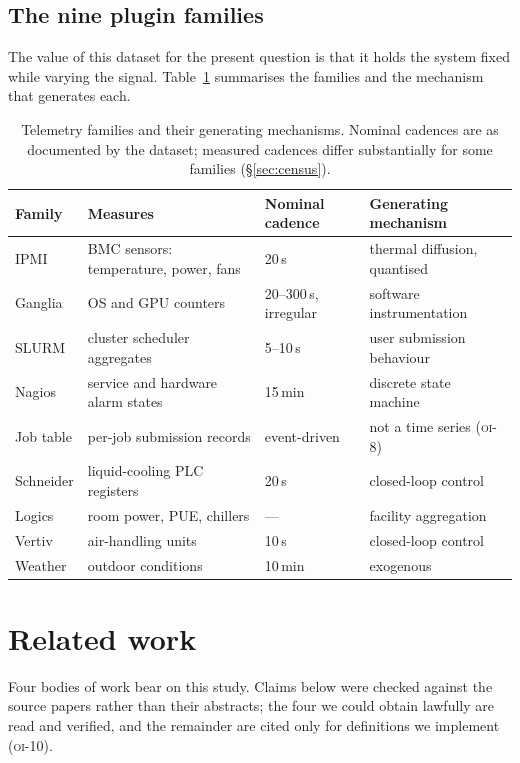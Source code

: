 \documentclass[11pt,a4paper]{article}
\newcommand{\unit}[2]{#1\,#2}
\newcommand{\unitrange}[3]{#1--#2\,#3}
\newcommand{\oi}[1]{\textsc{oi-#1}}
\begin{document}
\subsection{The nine plugin families}
\label{sec:families}

The value of this dataset for the present question is that it holds the system
fixed while varying the signal. Table~\ref{tab:families} summarises the
families and the mechanism that generates each.

\begin{table}[t]
\centering
\caption{Telemetry families and their generating mechanisms. Nominal cadences
are as documented by the dataset; measured cadences differ substantially for
some families (\S\ref{sec:census}).}
\label{tab:families}
\small
\begin{tabular}{llll}
\toprule
Family & Measures & Nominal cadence & Generating mechanism \\
\midrule
IPMI      & BMC sensors: temperature, power, fans & \unit{20}{s} & thermal diffusion, quantised \\
Ganglia   & OS and GPU counters                   & \unitrange{20}{300}{s}, irregular & software instrumentation \\
SLURM     & cluster scheduler aggregates          & \unitrange{5}{10}{s} & user submission behaviour \\
Nagios    & service and hardware alarm states     & \unit{15}{min} & discrete state machine \\
Job table & per-job submission records            & event-driven & not a time series (\oi{8}) \\
Schneider & liquid-cooling PLC registers          & \unit{20}{s} & closed-loop control \\
Logics    & room power, PUE, chillers             & --- & facility aggregation \\
Vertiv    & air-handling units                    & \unit{10}{s} & closed-loop control \\
Weather   & outdoor conditions                    & \unit{10}{min} & exogenous \\
\bottomrule
\end{tabular}
\end{table}

\section{Related work}
\label{sec:related}

Four bodies of work bear on this study. Claims below were checked against the
source papers rather than their abstracts; the four we could obtain lawfully are
read and verified, and the remainder are cited only for definitions we
implement (\oi{10}).
\end{document}
